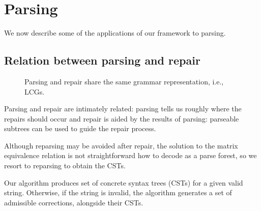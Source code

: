 \documentclass[sigplan,review,anonymous,acmsmall]{acmart}\settopmatter{printfolios=false,printccs=false,printacmref=false}
\begin{document}
\section{Parsing}

We now describe some of the applications of our framework to parsing.

\subsection{Relation between parsing and repair}\label{sec:sat}

\begin{figure}
  \vspace{-20pt}
  \resizebox{.4\textwidth}{!}{}
  \caption{Parsing and repair share the same grammar representation, i.e., LCGs.}
\end{figure}

Parsing and repair are intimately related: parsing tells us roughly where the repairs should occur and repair is aided by the results of parsing: parseable subtrees can be used to guide the repair process.

Although reparsing may be avoided after repair, the solution to the matrix equivalence relation is not straightforward how to decode as a parse forest, so we resort to reparsing to obtain the CSTs.



%

Our algorithm produces set of concrete syntax trees (CSTs) for a given valid string. Otherwise, if the string is invalid, the algorithm generates a set of admissible corrections, alongside their CSTs.
\end{document}

